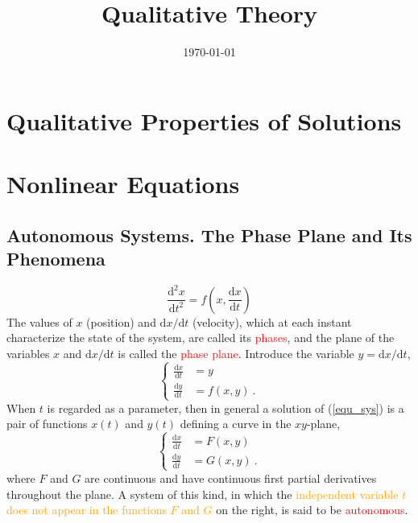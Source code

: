 \documentclass[12pt,a4paper]{article}
\title{Qualitative Theory}
\author{}
\date{\today}
\newcommand{\dif}{\mathrm{d}}
\begin{document}
\maketitle

\section{Qualitative Properties of Solutions}












\section{Nonlinear Equations}

\subsection{Autonomous Systems. The Phase Plane and Its Phenomena}
\begin{equation}
\frac{\dif^2 x}{\dif t^2} = f\left(x, \frac{\dif x}{\dif t} \right)
\end{equation}
The values of $x$ (position) and $\dif x/\dif t$ (velocity), which at each instant characterize the state of the system, are called its \textcolor{red}{phases}, and the plane of the variables $x$ and $\dif x/\dif t$ is called the \textcolor{red}{phase plane}. Introduce the variable $y = \dif x/\dif t$,
\begin{equation}
\left\{
\begin{aligned}
\frac{\dif x}{\dif t} &= y \\
\frac{\dif y}{\dif t} &= f(x, y) ~.
\label{equ_sys}
\end{aligned}
\right.
\end{equation}
When $t$ is regarded as a parameter, then in general a solution of (\ref{equ_sys}) is a pair of functions $x(t)$ and $y(t)$ defining a curve in the $xy$-plane, 
\begin{equation}
\left\{
\begin{aligned}
\frac{\dif x}{\dif t} &= F(x, y) \\
\frac{\dif y}{\dif t} &= G(x, y) ~.
\label{equ_sys_ge}
\end{aligned}
\right.
\end{equation}
where $F$ and $G$ are continuous and have continuous first partial derivatives throughout the plane. A system of this kind, in which the \textcolor{orange}{independent variable $t$ does not appear in the functions $F$ and $G$} on the right, is said to be \textcolor{red}{autonomous}. 
\end{document}
